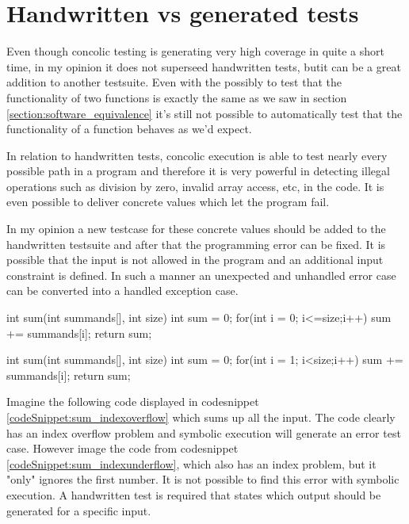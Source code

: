 \section{Handwritten vs generated tests}
Even though concolic testing is generating very high coverage in quite a short time, in my opinion it does not superseed handwritten tests, butit can be a great addition to another testsuite. 
Even with the possibly to test that the functionality of two functions is exactly the same as we saw in section \ref{section:software_equivalence} it's still not possible to automatically test that the functionality of a function behaves as we'd expect.

In relation to handwritten tests, concolic execution is able to test nearly every possible path in a program and therefore it is very powerful in detecting illegal operations such as division by zero, invalid array access, etc, in the code. It is even possible to deliver concrete values which let the program fail. 

In my opinion a new testcase for these concrete values should be added to the handwritten testsuite and after that the programming error can be fixed. It is possible that the input is not allowed in the program and an additional input constraint is defined. In such a manner an unexpected and unhandled error case can be converted into a handled exception case.

\begin{codesnippet}[caption={Sum with index overflow}, label={codeSnippet:sum_indexoverflow}]
int sum(int summands[], int size){
   int sum = 0;
   for(int i = 0; i<=size;i++){
      sum += summands[i];
   }
   return sum;
}
\end{codesnippet}
\begin{codesnippet}[caption={Sum with index "underflow"}, label={codeSnippet:sum_indexunderflow}]
int sum(int summands[], int size){
   int sum = 0;
   for(int i = 1; i<size;i++){
      sum += summands[i];
   }
   return sum;
}
\end{codesnippet}
Imagine the following code displayed in codesnippet \ref{codeSnippet:sum_indexoverflow} which sums up all the input. The code clearly has an index overflow problem and symbolic execution will generate an error test case. However image the code from codesnippet \ref{codeSnippet:sum_indexunderflow}, which also has an index problem, but it "only" ignores the first number. It is not possible to find this error with symbolic execution. A handwritten test is required that states which output should be generated for a specific input.